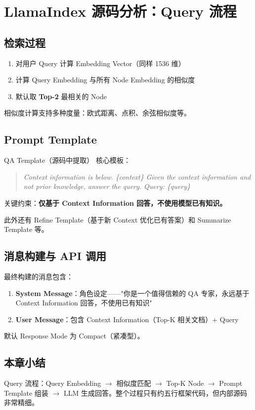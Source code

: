 \section{LlamaIndex 源码分析：Query 流程}

\subsection{检索过程}

\begin{enumerate}
    \item 对用户 Query 计算 Embedding Vector（同样 1536 维）
    \item 计算 Query Embedding 与所有 Node Embedding 的相似度
    \item 默认取 \textbf{Top-2} 最相关的 Node
\end{enumerate}

相似度计算支持多种度量：欧式距离、点积、余弦相似度等。

\subsection{Prompt Template}

\begin{importantbox}{QA Template（源码中提取）}
核心模板：
\begin{quote}
\textit{Context information is below. \{context\} Given the context information and not prior knowledge, answer the query. Query: \{query\}}
\end{quote}
关键约束：\textbf{仅基于 Context Information 回答，不使用模型已有知识。}
\end{importantbox}

此外还有 Refine Template（基于新 Context 优化已有答案）和 Summarize Template 等。

\subsection{消息构建与 API 调用}

最终构建的消息包含：
\begin{enumerate}
    \item \textbf{System Message}：角色设定——"你是一个值得信赖的 QA 专家，永远基于 Context Information 回答，不使用已有知识"
    \item \textbf{User Message}：包含 Context Information（Top-K 相关文档）+ Query
\end{enumerate}

默认 Response Mode 为 Compact（紧凑型）。

\subsection{本章小结}

Query 流程：Query Embedding $\rightarrow$ 相似度匹配 $\rightarrow$ Top-K Node $\rightarrow$ Prompt Template 组装 $\rightarrow$ LLM 生成回答。整个过程只有约五行框架代码，但内部源码非常精细。

